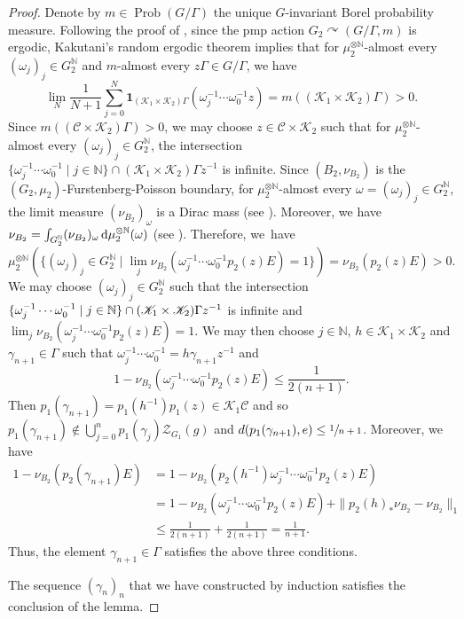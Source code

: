 \documentclass[JEP,XML,SOM,Unicode,published]{cedram}
\theoremstyle{definition}
\newcommand{\N}{\mathbb{N}}
\DeclareMathOperator{\Prob}{Prob}
\begin{document}
\begin{proof}
Denote by $m \in \Prob(G/\Gamma)$ the unique $G$-invariant Borel probability measure. Following the proof of \cite[Lem.\,5.1]{Pe14}, since the pmp action $G_2 \curvearrowright (G/\Gamma, m)$ is ergodic, Kakutani's random ergodic theorem implies that for $\mu_2^{\otimes \N}$-almost every $(\omega_j)_j \in G_2^{\N}$ and $m$-almost every $z\Gamma \in G/\Gamma$, we have
\[
\lim_N \frac{1}{N + 1} \sum_{j = 0}^N \mathbf 1_{(\mathscr K_1 \times \mathscr K_2)\Gamma}(\omega_j^{-1} \cdots \omega_0^{-1} z) = m((\mathscr K_1 \times \mathscr K_2)\Gamma) > 0.
\]
Since $m((\mathscr C \times \mathscr K_2)\Gamma) > 0$, we may choose $z \in \mathscr C \times \mathscr K_2$ such that for $\mu_2^{\otimes \N}$-almost every $(\omega_j)_j \in G_2^{\N}$, the intersection $\{ \omega_j^{-1} \cdots \omega_0^{-1} \mid j \in \N \} \cap (\mathscr K_1 \times \mathscr K_2)\Gamma z^{-1}$ is infinite. Since $(B_2, \nu_{B_2})$ is the $(G_2, \mu_2)$-Furstenberg-Poisson boundary, for $\mu_2^{\otimes \N}$-almost every $\omega = (\omega_j)_j \in G_2^\N$, the limit measure $(\nu_{B_2})_\omega$ is a Dirac mass (see \cite[Th.\,2.14]{BS04}). Moreover, we have $\nu_{B_2} = \int_{G_2^\N} (\nu_{B_2})_\omega\, {\rm d}\mu_2^{\otimes \N}(\omega)$ (see \cite[Th.\,2.10]{BS04}). Therefore, we~have
\[
\mu_2^{\otimes \N} (\{(\omega_j)_j \in G_2^\N \mid \lim_j \nu_{B_2}(\omega_j^{-1} \cdots \omega_0^{-1} p_2(z) E) = 1\}) = \nu_{B_2}(p_2(z) E) > 0.
\]
We may choose $(\omega_j)_j \in G_2^{\N}$ such that the intersection $\{ \omega_j^{-1} \cdots \omega_0^{-1} \mid j \in \N \} \cap (\mathscr K_1 \times\nobreak \mathscr K_2)\Gamma z^{-1}$ is infinite and $\lim_j \nu_{B_2}(\omega_j^{-1} \cdots \omega_0^{-1} p_2(z) E) = 1$. We may then choose $j \in \N$, $h \in \mathscr K_1 \times \mathscr K_2$ and $\gamma_{n + 1} \in \Gamma$ such that $\omega_j^{-1} \cdots \omega_0^{-1} = h \gamma_{n + 1} z^{-1}$ and
\[
1 - \nu_{B_2}(\omega_j^{-1} \cdots \omega_0^{-1} p_2(z) E) \leq \frac{1}{2(n + 1)}.
\]
Then $p_1(\gamma_{n + 1}) = p_1(h^{-1})p_1(z) \in \mathscr K_1 \mathscr C$ and so $p_1(\gamma_{n + 1}) \notin \bigcup_{j = 0}^n p_1(\gamma_j)\mathscr Z_{G_1}(g)$ and $d(p_1(\gamma_{n + 1}), e) \leq \sfrac{1}{n + 1}$. Moreover, we have
\begin{align*}
1 - \nu_{B_2}(p_2(\gamma_{n + 1}) E) &= 1 - \nu_{B_2}(p_2(h^{-1}) \omega_j^{-1} \cdots \omega_0^{-1} p_2(z) E) \\
&= 1 - \nu_{B_2}(\omega_j^{-1} \cdots \omega_0^{-1} p_2(z) E) + \|p_2(h)_\ast \nu_{B_2} - \nu_{B_2}\|_1 \\
&\leq \frac{1}{2(n + 1)} + \frac{1}{2(n + 1)} = \frac{1}{n + 1}.
\end{align*}
Thus, the element $\gamma_{n + 1} \in \Gamma$ satisfies the above three conditions.

The sequence $(\gamma_n)_n$ that we have constructed by induction satisfies the conclusion of the lemma.
\end{proof}
\end{document}

